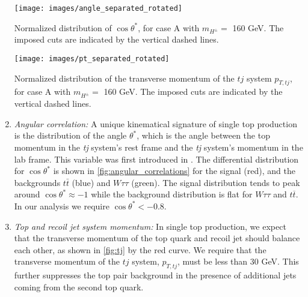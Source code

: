 \begin{enumerate}
\begin{marginfigure}[-8in]
\centering
\texttt{[image: images/angle\_separated\_rotated]}\hfill
 \caption{Normalized distribution of $\cos\theta^*$, for case A with $m_{H^{\pm}}=$ 160 GeV. The imposed cuts are indicated by the vertical dashed lines.}
\label{fig:angular_correlations}
\end{marginfigure}

\begin{marginfigure}[-3in]
\centering
\texttt{[image: images/pt\_separated\_rotated]}
 \caption{Normalized distribution of the transverse momentum of the $tj$ system $p_{T,tj}$, for case A with $m_{H^{\pm}}=$ 160 GeV. The imposed cuts are indicated by the vertical dashed lines.}
\label{fig:tj}
\end{marginfigure}

\item \emph{Angular correlation:} A unique kinematical signature of single top production is the distribution of the angle $\theta^{*}$, which is the angle between the top momentum in the \emph{tj} system's rest frame and the \emph{tj} system's momentum in the lab frame. This variable was first introduced in \cite{Kling:2012up}. The differential distribution for $\cos\theta^{*}$ is shown in \autoref{fig:angular_correlations} for the signal (red), and the backgrounds $t\bar{t}$ (blue) and $W\tau\tau$ (green). The signal distribution tends to peak around $\cos\theta^* \approx -1$ while the background distribution is flat for $W\tau\tau$ and $t\overline{t}$. In our analysis we require $\cos\theta^*< -0.8$.
 
\item\emph{Top and recoil jet system momentum:} In single top production, we expect that the transverse momentum of the top quark and recoil jet should balance each other, as shown in \autoref{fig:tj} by the red curve. We require that the transverse momentum of the $tj$ system, $p_{T,tj}$, must be less than 30 GeV. This further suppresses the top pair background in the presence of additional jets coming from the second top quark.
\end{enumerate}
